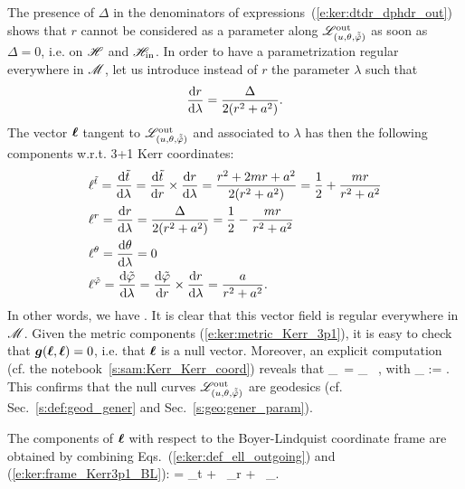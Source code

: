 The presence of $\Delta$ in the denominators of expressions~(\ref{e:ker:dtdr_dphdr_out})
shows that $r$ cannot be considered as
a parameter along $\mathscr{L}^{\rm out}_{(u,\theta,\tilde{{\tilde\varphi}})}$ as soon as
$\Delta=0$, i.e. on $\mathscr{H}$ and $\mathscr{H}_{\rm in}$.
In order to have a parametrization regular everywhere in $\mathscr{M}$, let us introduce
instead of $r$
the parameter $\lambda$ such that
\[
    \frac{\mathrm{d} r}{\mathrm{d}\lambda} = \frac{\Delta}{2(r^2+a^2)} .
\]
The vector $\bm{\ell}$ tangent to $\mathscr{L}^{\rm out}_{(u,\theta,\tilde{{\tilde\varphi}})}$ and associated
to $\lambda$ has then the following components w.r.t. 3+1 Kerr coordinates:
\begin{align}
& \ell^{{\tilde t}} = \frac{\mathrm{d} {\tilde t}}{\mathrm{d}\lambda} = \frac{\mathrm{d} {\tilde t}}{\mathrm{d} r}\times\frac{\mathrm{d} r}{\mathrm{d}\lambda}
    = \frac{r^2 + 2m r + a^2}{2(r^2+a^2)} = \frac{1}{2} + \frac{m r}{r^2 + a^2} \nonumber \\
& \ell^{r} = \frac{\mathrm{d} r}{\mathrm{d}\lambda} = \frac{\Delta}{2(r^2+a^2)} = \frac{1}{2} - \frac{m r}{r^2 + a^2}\nonumber \\
& \ell^{\theta} = \frac{\mathrm{d} \theta}{\mathrm{d}\lambda} = 0 \nonumber\\
& \ell^{{\tilde\varphi}} = \frac{\mathrm{d} {\tilde\varphi}}{\mathrm{d}\lambda} = \frac{\mathrm{d} {\tilde\varphi}}{\mathrm{d} r}\times\frac{\mathrm{d} r}{\mathrm{d}\lambda}
    = \frac{a}{r^2+a^2} . \nonumber
\end{align}
In other words, we have
\be \label{e:ker:def_ell_outgoing}
     .
\ee
It is clear that this vector field is regular everywhere in $\mathscr{M}$.
Given the metric components (\ref{e:ker:metric_Kerr_3p1}), it is easy
to check that $\bm{g}(\bm{\ell},\bm{\ell})=0$, i.e. that $\bm{\ell}$ is a null vector.
Moreover, an explicit computation (cf. the notebook~\ref{s:sam:Kerr_Kerr_coord}) reveals that
\be \label{e:ker:pregeod_ell}
    \wnab_{\wl}\, \wl = \kappa_{\wl} \, \wl ,
\ee
with
\be \label{e:ker:bar_kappa}
    \kappa_{\wl} :=  .
\ee
This confirms that the null curves $\mathscr{L}^{\rm out}_{(u,\theta,\tilde{{\tilde\varphi}})}$ are
geodesics (cf. Sec.~\ref{s:def:geod_gener} and Sec.~\ref{s:geo:gener_param}).

The components of $\bm{\ell}$ with respect to the Boyer-Lindquist coordinate frame
are obtained by combining Eqs.~(\ref{e:ker:def_ell_outgoing}) and (\ref{e:ker:frame_Kerr3p1_BL}):
\be \label{e:ker:ell_BL}
    \wl =  \wpar_t + \, \wpar_r
    + \, \wpar_\ph .
\ee



